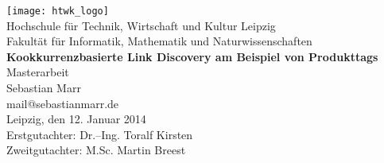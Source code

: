 \thispagestyle{plain}
\begin{titlepage}
\begin{center}
\texttt{[image: htwk\_logo]}\\
\vspace{0.3cm}
\normalsize
Hochschule für Technik, Wirtschaft und Kultur Leipzig\\
Fakultät für Informatik, Mathematik und Naturwissenschaften\\
\vspace{3.2cm}
\huge{\textbf{\textsf{Kookkurrenzbasierte Link Discovery am Beispiel von Produkttags}}}\\
\vspace{1cm}
\LARGE{\textsf{Masterarbeit}}\\
\vspace{3.2cm}
\normalsize
Sebastian Marr\\
mail@sebastianmarr.de\\
Leipzig, den 12. Januar 2014\\
\vspace{3.2cm}
Erstgutachter: Dr.--Ing. Toralf Kirsten \\
Zweitgutachter: M.Sc. Martin Breest
\clearpage
\end{center}
\end{titlepage}